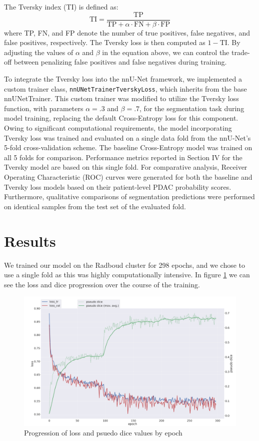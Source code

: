 \documentclass[conference]{IEEEtran}
\begin{document}
The Tversky index (TI) is defined as:
\[
\text{TI} = \frac{\text{TP}}{\text{TP} + \alpha \cdot \text{FN} + \beta \cdot \text{FP}}
\]
where TP, FN, and FP denote the number of true positives, false negatives, and false positives, respectively. The Tversky loss is then computed as $1 - \text{TI}$. By adjusting the values of $\alpha$ and $\beta$ in the equation above, we can control the trade-off between penalizing false positives and false negatives during training.

To integrate the Tversky loss into the nnU-Net framework, we implemented a custom trainer class, \texttt{nnUNetTrainerTverskyLoss}, which inherits from the base nnUNetTrainer. This custom trainer was modified to utilize the Tversky loss function, with parameters $\alpha=.3$ and $\beta=.7$, for the segmentation task during model training, replacing the default Cross-Entropy loss for this component. Owing to significant computational requirements, the model incorporating Tversky loss was trained and evaluated on a single data fold from the nnU-Net's 5-fold cross-validation scheme. The baseline Cross-Entropy model was trained on all 5 folds for comparison. Performance metrics reported in Section IV for the Tversky model are based on this single fold. For comparative analysis, Receiver Operating Characteristic (ROC) curves were generated for both the baseline and Tversky loss models based on their patient-level PDAC probability scores. Furthermore, qualitative comparisons of segmentation predictions were performed on identical samples from the test set of the evaluated fold.
\section{Results}
We trained our model on the Radboud cluster for 298 epochs, and we chose to use a single fold as this was highly computationally intensive. In figure \ref{fig:progress} we can see the loss and dice progression over the course of the training.

\begin{figure}[htbp]
  \centering
  \includegraphics[width=0.75\linewidth]{./figures/progress[1].png}
  \caption{Progression of loss and psuedo dice values by epoch}
  \label{fig:progress}
\end{figure}
\end{document}
